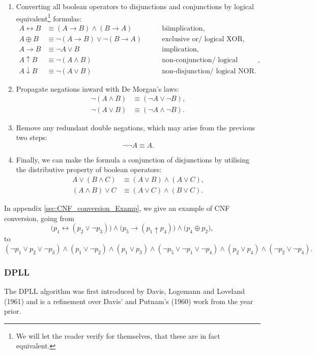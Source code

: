 \begin{enumerate}
    \item Converting all boolean operators to disjunctions and conjunctions by logical equivalent\footnote{We will let the reader verify for themselves, that these are in fact equivalent.} formulas:
    \begin{align*}
        A \leftrightarrow B &\equiv (A \rightarrow  B) \wedge (B \rightarrow A) \qquad &\text{biimplication},
        \\
        A \oplus B &\equiv \neg (A \rightarrow B) \vee \neg (B \rightarrow A) \qquad &\text{exclusive or/ logical XOR},
        \\
        A \rightarrow B &\equiv \neg A \vee B \qquad &\text{implication},
        \\
        A \uparrow B &\equiv \neg (A \wedge B) \qquad &\text{non-conjunction/ logical NAND},
        \\
        A \downarrow B &\equiv \neg (A \vee B) \qquad &\text{non-disjunction/ logical NOR}.
    \end{align*}
    \item Propagate negations inward with De Morgan's laws\cite{A-Concise-Introduction-to-Logic,Introduction-to-logic,Math-Logic-for-CompSci}:
    \begin{align*}
        \neg (A \wedge B) &\equiv (\neg A \vee \neg B),
        \\
        \neg (A \vee B) &\equiv (\neg A \wedge \neg B).
    \end{align*}
    \item Remove any redundant double negations, which may arise from the previous two steps:
    \begin{equation*}
        \neg \neg A \equiv A.
    \end{equation*}
    \item Finally, we can make the formula a conjunction of disjunctions by utilising the distributive property of boolean operators:
    \begin{align*}
        A \vee (B \wedge C) &\equiv (A \vee B) \wedge (A \vee C),
        \\
        (A \wedge B) \vee C &\equiv (A \vee C) \wedge (B \vee C).
    \end{align*}
\end{enumerate}
In appendix \autoref{sec:CNF_conversion_Examp}, we give an example of CNF conversion, going from
\begin{equation*}
    \Big(
        p_1 \leftrightarrow (
            p_2 \vee \neg p_3
        )
    \Big) \wedge \Big(
        p_5 \rightarrow (
            p_1 \uparrow p_4
        )
    \Big) \wedge \Big(
        p_4 \oplus p_2
    \Big),
\end{equation*}
to
\begin{equation*}
    (
        \neg p_1 \vee p_2 \vee \neg p_3
    ) \wedge (
        p_1 \vee \neg p_2 
    ) \wedge (
        p_1 \vee p_3
    ) \wedge (
        \neg p_5 \vee \neg p_1 \vee \neg p_4
    ) \wedge (
        p_2 \vee p_4
    ) \wedge (
        \neg p_2 \vee \neg p_4
    ).
\end{equation*}


\subsubsection{DPLL}
The DPLL algorithm was first introduced by Davis, Logemann and Loveland (1961)\cite{Original-DPLL-Article} and is a refinement over Davis' and Putnam's (1960)\cite{Original-DP-Article} work from the year prior.


